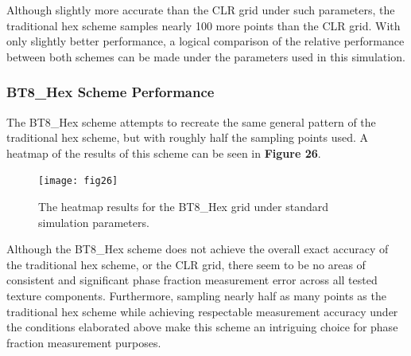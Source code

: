 \documentclass[10pt]{article}
\begin{document}
Although slightly more accurate than the CLR grid under such parameters, 
the traditional hex scheme samples nearly 100 more points than the CLR grid.
With only slightly better performance, a logical comparison of the 
relative performance between both schemes can be made under the parameters used in
this simulation. 

\subsubsection{BT8\_Hex Scheme Performance}
The BT8\_Hex scheme attempts to recreate the same general pattern of the traditional hex scheme, but with roughly half the sampling points 
used. A heatmap of the results of this scheme can be seen in \textbf{Figure 26}.
\begin{figure}[h]
    \centering
    \texttt{[image: fig26]}
    \caption{\label{tab1}The heatmap results for the BT8\_Hex grid under standard simulation parameters.} 
    \end{figure}

Although the BT8\_Hex scheme does not achieve the overall exact accuracy of the traditional hex scheme, or the CLR grid, there seem to be no
areas of consistent and significant phase fraction measurement error across all tested texture components. Furthermore, 
sampling nearly half as many points as the traditional hex scheme while achieving respectable measurement accuracy under the 
conditions elaborated above make this scheme an intriguing choice for phase fraction measurement purposes.
\end{document}
